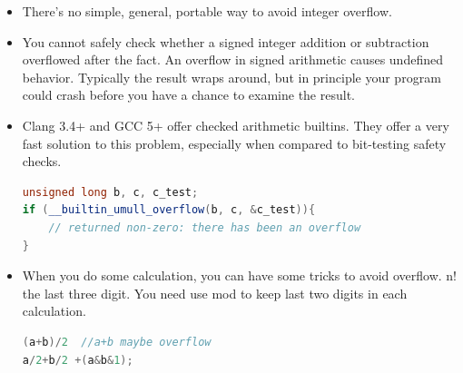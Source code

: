 \documentclass[a4paper,12pt,twoside]{book}
\begin{document}
\begin{itemize}
\begin{enumerate}
\begin{lstlisting}[frame=single, language=c++]
if ((x < 0) && (a < INT_MIN - x)) /* `a + x` would underflow */;
// a is point, x<0 anti-clockwise turn,  so it will underflow
//It's easy to understand if you draw a clock figure.
	
if ((x < 0) && (a > INT_MAX + x)) /* `a - x` would overflow */;
if ((x > 0) && (a < INT_MIN + x)) /* `a - x` would underflow */;
	
if (a > INT_MAX / x) /* `a * x` would overflow */;
if ((a < INT_MIN / x)) /* `a * x` would underflow */;
// need to check for -1 for two's complement machines
if ((a == -1) && (x == INT_MIN)) /* `a * x` overflow */
if ((x == -1) && (a == INT_MIN)) /* `a * x` (or `a / x`) overflow */
\end{lstlisting}
	
	\item Judge it after calculation
\begin{lstlisting}[frame=single, language=c++]
uint32 a,b;
//assign values
uint32 result = a + b;
if (result < a) {
	//Overflow
}
\end{lstlisting}
\end{enumerate}
	

	\item There's no simple, general, portable way to avoid integer overflow.
	\item You cannot safely check whether a signed integer addition or subtraction overflowed after the fact. An overflow in signed arithmetic causes undefined behavior. Typically the result wraps around, but in principle your program could crash before you have a chance to examine the result.
	
	\item Clang 3.4+ and GCC 5+ offer checked arithmetic builtins. They offer a very fast solution to this problem, especially when compared to bit-testing safety checks.
\begin{lstlisting}[frame=single, language=c++]
unsigned long b, c, c_test;
if (__builtin_umull_overflow(b, c, &c_test)){
	// returned non-zero: there has been an overflow
}
	\end{lstlisting}
	
	\item When you do some calculation, you can have some tricks to avoid overflow. n! the last three digit. You need use mod to keep last two digits in each calculation.
\begin{lstlisting}[frame=single, language=c++]
(a+b)/2  //a+b maybe overflow
a/2+b/2 +(a&b&1);
\end{lstlisting}
	
\end{itemize}
\end{document}
